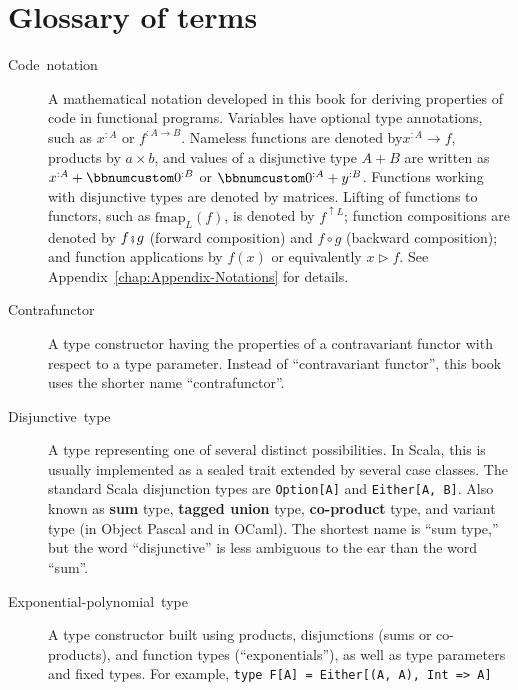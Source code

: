 \chapter{Glossary of terms\label{chap:Appendix-Glossary-of-terms}}
\begin{description}
\item [{Code~notation}] A mathematical notation
developed in this book for deriving properties of code in functional
programs. Variables have optional type annotations, such as $x^{:A}$
or $f^{:A\rightarrow B}$. Nameless functions are denoted by$x^{:A}\rightarrow f$,
products by $a\times b$, and values of a disjunctive type $A+B$
are written as $x^{:A}+\bbnum 0^{:B}$ or $\bbnum 0^{:A}+y^{:B}$.
Functions working with disjunctive types are denoted by matrices.
Lifting of functions to functors, such as $\text{fmap}_{L}(f)$, is
denoted by $f^{\uparrow L}$; function compositions are denoted by
$f\bef g$ (forward composition) and $f\circ g$ (backward composition);
and function applications by $f(x)$ or equivalently $x\triangleright f$.
See Appendix~\ref{chap:Appendix-Notations} for details.
\item [{Contrafunctor}] A type constructor having
the properties of a contravariant functor with
respect to a type parameter. Instead of \textsf{``}contravariant functor\textsf{''},
this book uses the shorter name \textsf{``}contrafunctor\textsf{''}.
\item [{Disjunctive~type}] A type representing
one of several distinct possibilities. In Scala, this is usually implemented
as a sealed trait extended by several case classes. The standard Scala
disjunction types are \lstinline!Option[A]! and \lstinline!Either[A, B]!.
Also known as \textbf{sum
}type, \textbf{tagged union}
type, \textbf{co-product}
type, and variant type (in Object Pascal and in OCaml). The shortest
name is \textsf{``}sum type,\textsf{''} but the word \textsf{``}disjunctive\textsf{''} is less ambiguous
to the ear than the word \textsf{``}sum\textsf{''}.
\item [{Exponential-polynomial~type}] A
type constructor built using products, disjunctions (sums or co-products),
and function types (\textsf{``}exponentials\textsf{''}), as well as type parameters
and fixed types. For example,  \lstinline!type F[A] = Either[(A, A), Int => A]!

\end{description}
